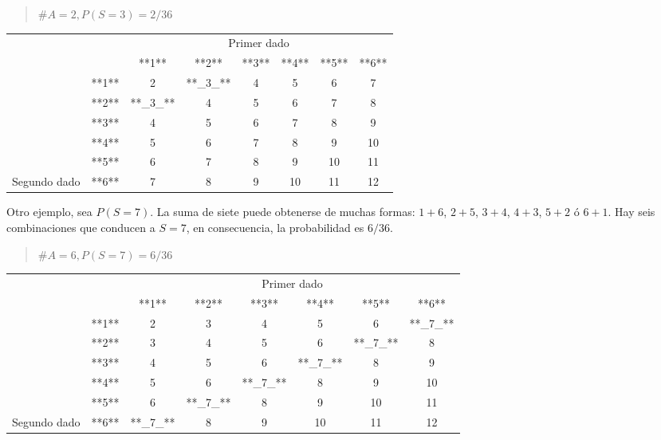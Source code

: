 \documentclass[]{book}
\begin{document}
\begin{quote}
\(\#A = 2, P(S = 3)=2/36\)
\end{quote}

\begin{table}[H]
\centering
\begin{tabular}{lccccccc}
\toprule
\multicolumn{2}{c}{ } & \multicolumn{6}{c}{Primer dado} \\
\cmidrule(l{3pt}r{3pt}){3-8}
 &  & **1** & **2** & **3** & **4** & **5** & **6**\\
\midrule
\rowcolor{gray!6}   & **1** & 2 & **\_3\_** & 4 & 5 & 6 & 7\\
\cmidrule{2-8}
 & **2** & **\_3\_** & 4 & 5 & 6 & 7 & 8\\
\cmidrule{2-8}
\rowcolor{gray!6}   & **3** & 4 & 5 & 6 & 7 & 8 & 9\\
\cmidrule{2-8}
 & **4** & 5 & 6 & 7 & 8 & 9 & 10\\
\cmidrule{2-8}
\rowcolor{gray!6}   & **5** & 6 & 7 & 8 & 9 & 10 & 11\\
\cmidrule{2-8}
\multirow[t]{-6}{*}{\raggedright\arraybackslash Segundo dado} & **6** & 7 & 8 & 9 & 10 & 11 & 12\\
\bottomrule
\end{tabular}
\end{table}

Otro ejemplo, sea \(P(S=7)\). La suma de siete puede obtenerse de muchas
formas: \(1+6\), \(2+5\), \(3+4\), \(4+3\), \(5+2\) ó \(6+1\). Hay seis combinaciones que
conducen a \(S=7\), en consecuencia, la probabilidad es \(6/36\).

\begin{quote}
\(\#A = 6, P(S = 7)=6/36\)
\end{quote}

\begin{table}[H]
\centering
\begin{tabular}{lccccccc}
\toprule
\multicolumn{2}{c}{ } & \multicolumn{6}{c}{Primer dado} \\
\cmidrule(l{3pt}r{3pt}){3-8}
 &  & **1** & **2** & **3** & **4** & **5** & **6**\\
\midrule
\rowcolor{gray!6}   & **1** & 2 & 3 & 4 & 5 & 6 & **\_7\_**\\
\cmidrule{2-8}
 & **2** & 3 & 4 & 5 & 6 & **\_7\_** & 8\\
\cmidrule{2-8}
\rowcolor{gray!6}   & **3** & 4 & 5 & 6 & **\_7\_** & 8 & 9\\
\cmidrule{2-8}
 & **4** & 5 & 6 & **\_7\_** & 8 & 9 & 10\\
\cmidrule{2-8}
\rowcolor{gray!6}   & **5** & 6 & **\_7\_** & 8 & 9 & 10 & 11\\
\cmidrule{2-8}
\multirow[t]{-6}{*}{\raggedright\arraybackslash Segundo dado} & **6** & **\_7\_** & 8 & 9 & 10 & 11 & 12\\
\bottomrule
\end{tabular}
\end{table}
\end{document}
